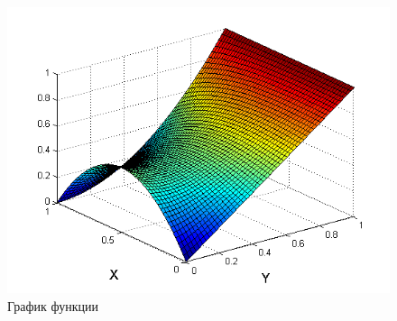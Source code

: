 \documentclass[titlepage,12pt]{article}
\begin{document}
\begin{figure}[h]
\includegraphics[width = 16cm]{Screen.png}
\caption{График функции}
\label{fig:16}	
\end{figure}
\end{document}
